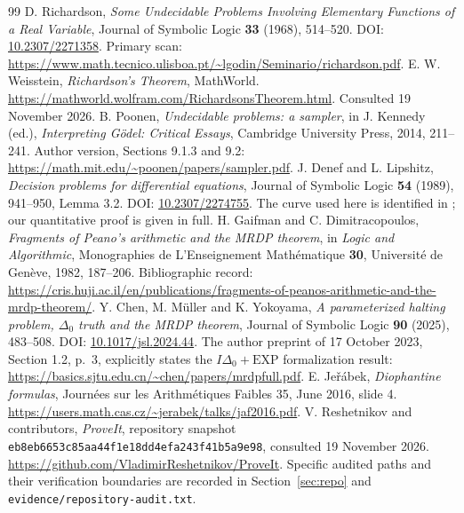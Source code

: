 \documentclass[11pt,a4paper]{article}
\theoremstyle{definition}
\newcommand{\code}[1]{\texttt{#1}}
\begin{document}



\appendix


\clearpage
\begin{thebibliography}{99}
 D. Richardson, \emph{Some Undecidable Problems Involving Elementary Functions of a Real Variable}, Journal of Symbolic Logic \textbf{33} (1968), 514--520. DOI: \href{https://doi.org/10.2307/2271358}{10.2307/2271358}. Primary scan: \url{https://www.math.tecnico.ulisboa.pt/~lgodin/Seminario/richardson.pdf}.
 E. W. Weisstein, \emph{Richardson's Theorem}, MathWorld. \url{https://mathworld.wolfram.com/RichardsonsTheorem.html}. Consulted 19 November 2026.
 B. Poonen, \emph{Undecidable problems: a sampler}, in J. Kennedy (ed.), \emph{Interpreting G\"odel: Critical Essays}, Cambridge University Press, 2014, 211--241. Author version, Sections 9.1.3 and 9.2: \url{https://math.mit.edu/~poonen/papers/sampler.pdf}.
 J. Denef and L. Lipshitz, \emph{Decision problems for differential equations}, Journal of Symbolic Logic \textbf{54} (1989), 941--950, Lemma 3.2. DOI: \href{https://doi.org/10.2307/2274755}{10.2307/2274755}. The curve used here is identified in \cite[Remark 9.3]{poonen}; our quantitative proof is given in full.
 H. Gaifman and C. Dimitracopoulos, \emph{Fragments of Peano's arithmetic and the MRDP theorem}, in \emph{Logic and Algorithmic}, Monographies de L'Enseignement Math\'ematique \textbf{30}, Universit\'e de Gen\`eve, 1982, 187--206. Bibliographic record: \url{https://cris.huji.ac.il/en/publications/fragments-of-peanos-arithmetic-and-the-mrdp-theorem/}.
 Y. Chen, M. M\"uller and K. Yokoyama, \emph{A parameterized halting problem, $\Delta_0$ truth and the MRDP theorem}, Journal of Symbolic Logic \textbf{90} (2025), 483--508. DOI: \href{https://doi.org/10.1017/jsl.2024.44}{10.1017/jsl.2024.44}. The author preprint of 17 October 2023, Section 1.2, p.~3, explicitly states the $I\Delta_0+\mathrm{EXP}$ formalization result: \url{https://basics.sjtu.edu.cn/~chen/papers/mrdpfull.pdf}.
 E. Je\v{r}\'abek, \emph{Diophantine formulas}, Journ\'ees sur les Arithm\'etiques Faibles 35, June 2016, slide 4. \url{https://users.math.cas.cz/~jerabek/talks/jaf2016.pdf}.
 V. Reshetnikov and contributors, \emph{ProveIt}, repository snapshot \texttt{eb8eb6653c85aa44f1e18dd4efa243f41b5a9e98}, consulted 19 November 2026. \url{https://github.com/VladimirReshetnikov/ProveIt}. Specific audited paths and their verification boundaries are recorded in Section~\ref{sec:repo} and \code{evidence/repository-audit.txt}.
\end{thebibliography}
\end{document}
